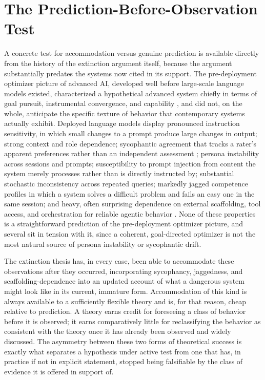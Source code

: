 \section{The Prediction-Before-Observation Test}

A concrete test for accommodation versus genuine prediction is available directly from the history of the extinction argument itself, because the argument substantially predates the systems now cited in its support. The pre-deployment optimizer picture of advanced AI, developed well before large-scale language models existed, characterized a hypothetical advanced system chiefly in terms of goal pursuit, instrumental convergence, and capability \cite{amodei2016,hubinger2019,ngo2022}, and did not, on the whole, anticipate the specific texture of behavior that contemporary systems actually exhibit. Deployed language models display pronounced instruction sensitivity, in which small changes to a prompt produce large changes in output; strong context and role dependence; sycophantic agreement that tracks a rater's apparent preferences rather than an independent assessment \cite{sharma2023,turpin2023}; persona instability across sessions and prompts; susceptibility to prompt injection from content the system merely processes rather than is directly instructed by; substantial stochastic inconsistency across repeated queries; markedly jagged competence profiles in which a system solves a difficult problem and fails an easy one in the same session; and heavy, often surprising dependence on external scaffolding, tool access, and orchestration for reliable agentic behavior \cite{ouyang2022,bai2022,schick2023,perez2023,greenblatt2024}. None of these properties is a straightforward prediction of the pre-deployment optimizer picture, and several sit in tension with it, since a coherent, goal-directed optimizer is not the most natural source of persona instability or sycophantic drift.

The extinction thesis has, in every case, been able to accommodate these observations after they occurred, incorporating sycophancy, jaggedness, and scaffolding-dependence into an updated account of what a dangerous system might look like in its current, immature form. Accommodation of this kind is always available to a sufficiently flexible theory and is, for that reason, cheap relative to prediction. A theory earns credit for foreseeing a class of behavior before it is observed; it earns comparatively little for reclassifying the behavior as consistent with the theory once it has already been observed and widely discussed. The asymmetry between these two forms of theoretical success is exactly what separates a hypothesis under active test from one that has, in practice if not in explicit statement, stopped being falsifiable by the class of evidence it is offered in support of.

